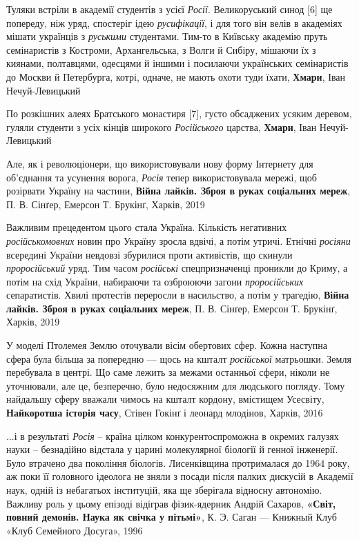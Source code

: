 Туляки встріли в академії студентів з усієї \emph{Росії}. Великоруський синод
[6] ще попереду, ніж уряд, спостеріг ідею \emph{русифікації}, і для того він
велів в академіях мішати українців з \emph{руськими} студентами. Тим-то в
Київську академію пруть семінаристів з Костроми, Архангельська, з Волги й
Сибіру, мішаючи їх з киянами, полтавцями, одесцями й іншими і посилаючи
українських семінаристів до Москви й Петербурга, котрі, одначе, не мають охоти
туди їхати, \textbf{Хмари}, Іван Нечуй-Левицький

По розкішних алеях Братського монастиря [7], густо обсаджених усяким деревом,
гуляли студенти з усіх кінців широкого \emph{Російського} царства,
\textbf{Хмари}, Іван Нечуй-Левицький

Але, як і революціонери, що використовували нову форму Інтернету для об'єднання
та усунення ворога, \emph{Росія} тепер використовувала мережі, щоб розірвати Україну
на частини, \textbf{Війна лайків. Зброя в руках соціальних мереж}, П. В.
Сінґер, Емерсон Т. Брукінґ, Харків, 2019

Важливим прецедентом цього стала Україна. Кількість негативних
\emph{російськомовних} новин про Україну зросла вдвічі, а потім утричі. Етнічні
\emph{росіяни} всередині України невдовзі збурилися проти активістів, що
скинули \emph{проросійський} уряд. Тим часом \emph{російські} спецпризначенці
проникли до Криму, а потім на схід України, набираючи та озброюючи загони
\emph{проросійських} сепаратистів. Хвилі протестів переросли в насильство, а
потім у трагедію, \textbf{Війна лайків. Зброя в руках соціальних мереж}, П. В.
Сінґер, Емерсон Т. Брукінґ, Харків, 2019

У моделі Птолемея Землю оточували вісім обертових сфер. Кожна наступна сфера
була більша за попередню — щось на кшталт \emph{російської} матрьошки. Земля
перебувала в центрі. Що саме лежить за межами останньої сфери, ніколи не
уточнювали, але це, безперечно, було недосяжним для людського погляду. Тому
найдальшу сферу вважали чимось на кшталт кордону, вмістищем Усесвіту,
\textbf{Найкоротша історія часу}, Стівен Гокінґ і леонард млодінов, Харків,
2016

...і в результаті \emph{Росія} – країна цілком конкурентоспроможна в окремих галузях
науки – безнадійно відстала у царині молекулярної біології й генної інженерії.
Було втрачено два покоління біологів. Лисенківщина протрималася до 1964 року,
аж поки її головного ідеолога не зняли з посади після палких дискусій в
Академії наук, одній із небагатьох інституцій, яка ще зберігала відносну
автономію. Важливу роль у цьому епізоді відіграв фізик-ядерник Андрій Сахаров,
\textbf{«Світ, повний демонів. Наука як свічка у пітьмі»}, К. Э. Саган —
Книжный Клуб «Клуб Семейного Досуга», 1996

